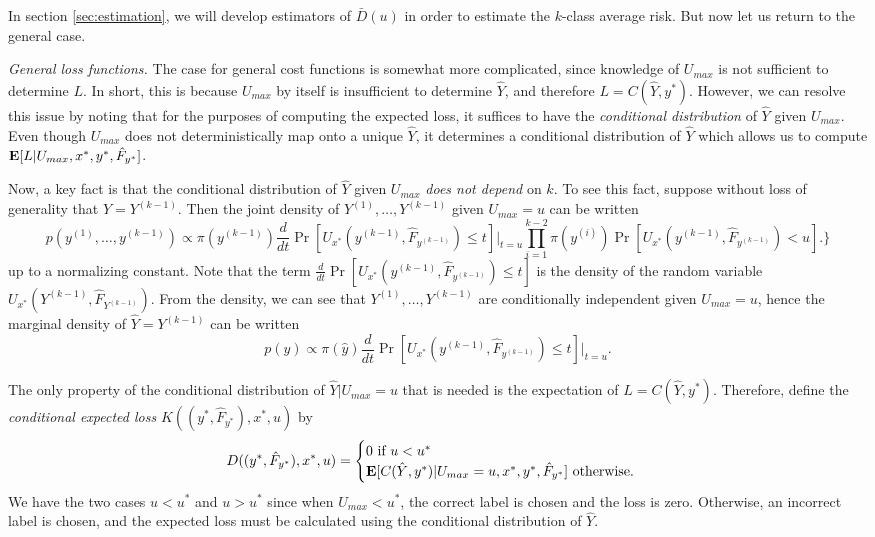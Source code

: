 \documentclass[12pt]{article}
\begin{document}
In section \ref{sec:estimation}, we will develop estimators of
$\bar{D}(u)$ in order to estimate the $k$-class average risk.
But now let us return to the general case.
\newline

\noindent \emph{General loss functions.}
The case for general cost functions is somewhat more complicated,
since knowledge of $U_{max}$ is not sufficient to determine $L$.  In
short, this is because $U_{max}$ by itself is insufficient to
determine $\hat{Y}$, and therefore $L=C(\hat{Y}, y^*)$.  However, we
can resolve this issue by noting that for the purposes of computing
the expected loss, it suffices to have the \emph{conditional
distribution} of $\hat{Y}$ given $U_{max}$.  Even though $U_{max}$
does not deterministically map onto a unique $\hat{Y}$, it determines
a conditional distribution of $\hat{Y}$ which allows us to compute
$\textbf{E}[L|U_{max}, x^*, y^*, \hat{F}_{y^*}]$.

Now, a key fact is that the conditional distribution of $\hat{Y}$
given $U_{max}$ \emph{does not depend} on $k$.  To see this fact,
suppose without loss of generality that $\hat{Y} = Y^{(k-1)}.$ Then
the joint density of $Y^{(1)},\hdots, Y^{(k-1)}$ given $U_{max} =
u$ can be written
\[
p(y^{(1)},\hdots, y^{(k-1)}) \propto 
\pi(y^{(k-1)})\frac{d}{dt}\Pr[U_{x^*}(y^{(k-1)}, \hat{F}_{y^{(k-1)}}) \leq t]|_{t=u}
\prod_{i=1}^{k-2}\pi(y^{(i)})\Pr[U_{x^*}(y^{(k-1)}, \hat{F}_{y^{(k-1)}}) < u].
\}
\]
up to a normalizing constant.  Note that the term
$\frac{d}{dt}\Pr[U_{x^*}(y^{(k-1)}, \hat{F}_{y^{(k-1)}}) \leq t]$ is the
density of the random variable
$U_{x^*}(Y^{(k-1)}, \hat{F}_{Y^{(k-1)}})$. From the density, we can see
that $Y^{(1)},\hdots, Y^{(k-1)}$ are conditionally independent given
$U_{max} = u$, hence the marginal density of $\hat{Y}=Y^{(k-1)}$ can
be written
\[
p(\hat{y}) \propto \pi(\hat{y})\frac{d}{dt}\Pr[U_{x^*}(y^{(k-1)}, \hat{F}_{y^{(k-1)}}) \leq t]|_{t=u}.
\]

The only property of the conditional distribution of $\hat{Y}|U_{max} = u$ that is needed is
the expectation of $L = C(\hat{Y}, y^*)$.  Therefore, define the \emph{conditional expected loss} $K((y^*, \hat{F}_{y^*}), x^*, u)$ by
\begin{equation}\label{eq:Kfunc}
D((y^*, \hat{F}_{y^*}), x^*, u) = \begin{cases} 0 \text{ if } u < u^*\\
\textbf{E}[C(\hat{Y}, y^*)|U_{max} = u, x^*, y^*, \hat{F}_{y^*}] \text{ otherwise.}
\end{cases}
\end{equation}
We have the two cases $u < u^*$ and $u > u^*$ since when $U_{max} <
u^*$, the correct label is chosen and the loss is zero.  Otherwise, an
incorrect label is chosen, and the expected loss must be calculated
using the conditional distribution of $\hat{Y}$.
\end{document}
